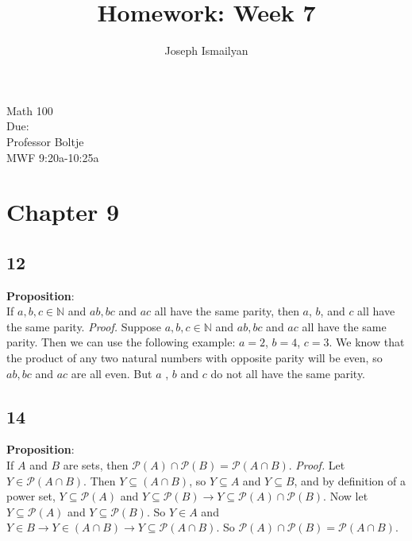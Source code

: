 \documentclass[12pt]{article}
\newcommand{\dueDate}{\formatdate{17}{11}{2017}} %
\newcommand{\hwNum}{7}
\begin{document}
	
\title{Homework: Week \hwNum}
\author{Joseph Ismailyan}
\date{}
\maketitle
\begin{flushleft}
Math 100 \\
Due: \dueDate \\ 
Professor Boltje \\
MWF 9:20a-10:25a
\end{flushleft}


\begin{minipage}[t]{0.40\textwidth}



\section*{Chapter 9}
\subsection*{12}
\textbf{Proposition}:  \\If $a,b,c\in \mathbb{N} $ and $ab, bc$ and $ac$ all have the same parity, then $a$, $b$, and $c$ all have the same parity.
\newline\textit{Proof.} Suppose $a,b,c\in \mathbb{N} $ and $ab, bc$ and $ac$ all have the same parity. Then we can use the following example: $a=2$, $b=4$, $c=3$. We know that the product of any two natural numbers with opposite parity will be even, so $ab, bc$ and $ac$ are all even. But $a$ , $b$ and $c$ do not all have the same parity.

\subsection*{14}
\textbf{Proposition}:  \\If $A$ and $B$ are sets, then $\mathscr{P}{(A)}\cap\mathscr{P}{(B)}=\mathscr{P}{(A\cap B)}$.
\newline\textit{Proof.} Let $ Y\in\mathscr{P}{(A\cap B)}$. Then $ Y\subseteq(A\cap B) $, so $ Y\subseteq A$ and $ Y\subseteq B$, and by definition of a power set, $ Y\subseteq\mathscr{P}{(A)}$ and $ Y\subseteq\mathscr{P}{(B)}\rightarrow Y\subseteq\mathscr{P}{(A)}\cap\mathscr{P}{(B)}$. Now let $ Y\subseteq\mathscr{P}{(A)}$ and $ Y\subseteq\mathscr{P}{(B)} $. So $ Y\in A$ and $ Y\in B \rightarrow Y\in(A\cap B)\rightarrow Y\subseteq\mathscr{P}{(A\cap B)}$. So $\mathscr{P}{(A)}\cap\mathscr{P}{(B)}=\mathscr{P}{(A\cap B)}$.


\end{minipage}
\end{document}
